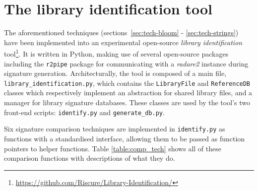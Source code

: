 \documentclass[twocolumn,a4paper]{IEEEtran} %
\begin{document}
\section{The library identification tool}
The aforementioned techniques (sections~\ref{sec:tech-bloom} - \ref{sec:tech-strings}) have been implemented into an experimental open-source \emph{library identification} tool\footnote{\url{https://github.com/Riscure/Library-Identification/}}.
It is written in Python, making use of several open-source packages including the \texttt{r2pipe} package for communicating with a \emph{radare2} instance during signature generation. Architecturally, the tool is composed of a main file, \texttt{library\_identification.py}, which contains the \texttt{LibraryFile} and \texttt{ReferenceDB} classes which respectively implement an abstraction for shared library files, and a manager for library signature databases. These classes are used by the tool's two front-end scripts: \texttt{identify.py} and \texttt{generate\_db.py}.

Six signature comparison techniques are implemented in \texttt{identify.py} as functions with a standardised interface, allowing them to be passed as function pointers to helper functions. Table \ref{table:comp_tech} shows all of these comparison functions with descriptions of what they do.
\end{document}
